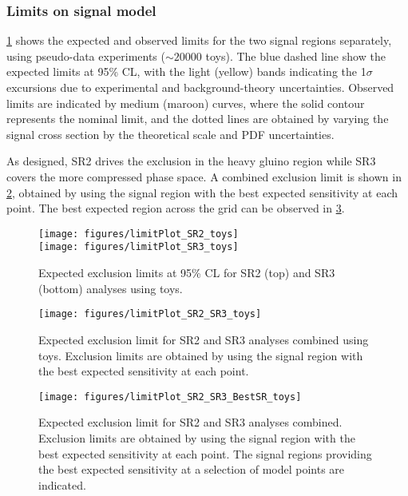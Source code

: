 \subsubsection{Limits on signal model}

\Fig \ref{fig:limit_SR_toys} shows the expected and observed limits for the two signal regions separately, using pseudo-data experiments ($\sim 20000$ toys). The blue dashed line show the expected
limits at 95\% CL, with the light (yellow) bands indicating the 1$\sigma$ excursions due to experimental and background-theory uncertainties.
Observed limits are indicated by medium (maroon) curves, where the
solid contour represents the nominal limit, and the dotted lines are obtained by varying the signal cross section
by the theoretical scale and PDF uncertainties.



As designed, SR2 drives the exclusion in the heavy gluino region while SR3 covers the more compressed phase space. A combined exclusion limit
is shown in \Fig \ref{fig:limit_SR_combined_toys}, obtained by using the signal region with the best expected sensitivity at each point. The best
expected region across the grid can be observed in \Fig \ref{fig:limit_SR_combined_best}.


\begin{figure}[h!]
  \begin{center}
     \texttt{[image: figures/limitPlot\_SR2\_toys]} \\
     \vspace{1cm}
     \texttt{[image: figures/limitPlot\_SR3\_toys]}
     \caption{Expected exclusion limits at 95\% CL for SR2 (top) and SR3 (bottom) analyses using toys.}
     \label{fig:limit_SR_toys}
  \end{center}
\end{figure}


\begin{figure}[h!]
  \begin{center}
     \texttt{[image: figures/limitPlot\_SR2\_SR3\_toys]} \\
     \caption{Expected exclusion limit for SR2 and SR3 analyses combined using toys. Exclusion limits are obtained by using
the signal region with the best expected sensitivity at each point.}
     \label{fig:limit_SR_combined_toys}
  \end{center}
\end{figure}

\begin{figure}[h!]
  \begin{center}
     \texttt{[image: figures/limitPlot\_SR2\_SR3\_BestSR\_toys]}
     \caption{Expected exclusion limit for SR2 and SR3 analyses combined. Exclusion limits are obtained by using
the signal region with the best expected sensitivity at each point. The signal regions providing the best expected sensitivity at a selection of model points are indicated.}
     \label{fig:limit_SR_combined_best}
  \end{center}
\end{figure}

